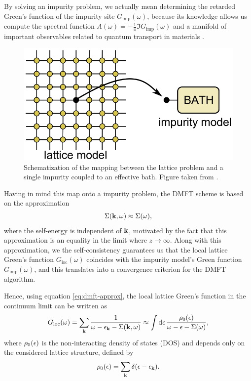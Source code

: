 \documentclass[12pt]{report}
\begin{document}
By solving an impurity problem, we actually mean determining the retarded Green's function of the impurity site $G_{\text{imp}}(\omega)$, because its knowledge allows us compute the spectral function $A(\omega) = - \frac{1}{\pi} \Im{G_{\text{imp}}(\omega)}$ \cite{bruus} and a manifold of important observables related to quantum transport in materials \cite{pedagogical-gfs}.

\begin{figure}[H]
\centering
\includegraphics[width=0.6\linewidth]{fig/dmft-mapping}
\caption{Schematization of the mapping between the lattice problem and a single impurity coupled to an effective bath. Figure taken from \cite{thesis_dmft_graz}.}
\label{fig:dmft-mapping}
\end{figure}

Having in mind this map onto a impurity problem, the DMFT scheme is based on the approximation
\begin{equation} \label{eq:dmft-approx}
\Sigma({\vb{k}}, \omega) \approx \Sigma(\omega),
\end{equation}
where the self-energy is independent of ${\vb{k}}$, motivated by the fact that this approximation is an equality in the limit where $z \to \infty$. Along with this approximation, we the self-consistency guarantees us that the local lattice Green's function $G_{\text{loc}}(\omega)$ coincides with the impurity model's Green function $G_{\text{imp}}(\omega)$, and this translates into a convergence criterion for the DMFT algorithm.

Hence, using equation \ref{eq:dmft-approx}, the local lattice Green's function in the continuum limit can be written as
\begin{equation} \label{eq:Gf-local}
G_{\text{loc}}(\omega) = \sum_{{\vb{k}}} \frac{1}{\omega-\epsilon_{\vb{k}}-\Sigma({\vb{k}}, \omega)} \approx
\int \dd{\epsilon} \frac{\rho_0(\epsilon)}{\omega - \epsilon - \Sigma(\omega)},
\end{equation}
where $\rho_0(\epsilon)$ is the non-interacting density of states (DOS) and depends only on the considered lattice structure, defined by
$$
\rho_0(\epsilon) = \sum_{{\vb{k}}} \delta(\epsilon-\epsilon_{\vb{k}}).
$$
\end{document}
